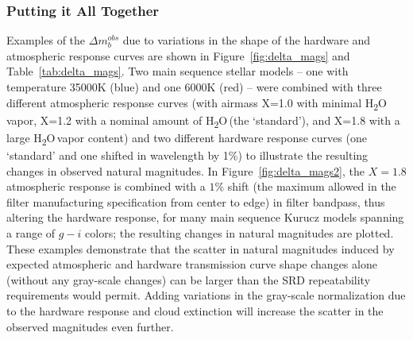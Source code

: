 \documentclass[12pt,preprint]{aastex}
\newcommand{\water}   {H\textsubscript{2}O}
\begin{document}
\subsubsection{Putting it All Together}
Examples of the $\Delta m_b^{obs}$ due to variations in the shape of
the hardware and atmospheric response curves are shown in
Figure~\ref{fig:delta_mags} and Table~\ref{tab:delta_mags}. Two main
sequence stellar models \citep{Kurucz1993} -- one with temperature
35000K (blue) and one 6000K (red) -- were combined with three
different atmospheric response curves (with airmass X=1.0 with minimal
\water\, vapor, X=1.2 with a nominal amount of \water\,(the
`standard'), and X=1.8 with a large \water\,vapor content) and two
different hardware response curves (one `standard' and one shifted in
wavelength by 1\%) to illustrate the resulting changes in observed
natural magnitudes. In Figure~\ref{fig:delta_mags2}, the $X=1.8$
atmospheric response is combined with a $1\%$ shift (the maximum
allowed in the filter manufacturing specification from center to edge)
in filter bandpass, thus altering the hardware response, for many main
sequence Kurucz models spanning a range of $g-i$ colors; the resulting
changes in natural magnitudes are plotted.  These examples demonstrate
that the scatter in natural magnitudes induced by expected atmospheric
and hardware transmission curve shape changes alone (without any
gray-scale changes) can be larger than the SRD repeatability
requirements would permit. Adding variations in the gray-scale
normalization due to the hardware response and cloud extinction will
increase the scatter in the observed magnitudes even further.
\end{document}
